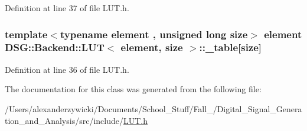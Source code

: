 Definition at line 37 of file L\+U\+T.\+h.

\hypertarget{classDSG_1_1Backend_1_1LUT_a23615428e84d6be4424c8b897866f253}{
\subsubsection[{\+\_\+table}]{\setlength{\rightskip}{0pt plus 5cm}template$<$typename element , unsigned long size$>$ element {\bf D\+S\+G\+::\+Backend\+::\+L\+U\+T}$<$ element, size $>$\+::\+\_\+table\mbox{[}size\mbox{]}\hspace{0.3cm}{\ttfamily [protected]}}}\label{classDSG_1_1Backend_1_1LUT_a23615428e84d6be4424c8b897866f253}


Definition at line 36 of file L\+U\+T.\+h.



The documentation for this class was generated from the following file\+:\begin{DoxyCompactItemize}
\item 
/\+Users/alexanderzywicki/\+Documents/\+School\+\_\+\+Stuff/\+Fall\+\_/\+Digital\+\_\+\+Signal\+\_\+\+Generation\+\_\+and\+\_\+\+Analysis/src/include/\hyperlink{LUT_8h}{L\+U\+T.\+h}\end{DoxyCompactItemize}
